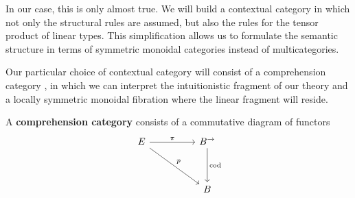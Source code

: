 In our case, this is only almost true. We will build a contextual category in which not only the structural rules are assumed, but also the rules for the tensor product of linear types. This simplification allows us to formulate the semantic structure in terms of symmetric monoidal categories instead of multicategories.

Our particular choice of contextual category will consist of a comprehension category \cite{jacobs}, in which we can interpret the intuitionistic fragment of our theory and a locally symmetric monoidal fibration where the linear fragment will reside.
\begin{defn}
A \textbf{comprehension category} consists of a commutative diagram of functors
\[
\ti
E \ar[rd, "p"] \ar[r, "\pi"]  & B^{\to} \ar[d, "\text{cod}"]\\
& B
\kz
\]


\end{defn}
